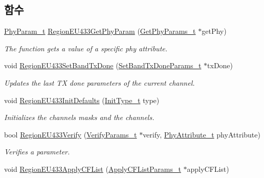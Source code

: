 \subsection*{함수}
\begin{DoxyCompactItemize}
\item 
\mbox{\hyperlink{group___r_e_g_i_o_n_gaed159b26e5c4677236b6e8677019db30}{Phy\+Param\+\_\+t}} \mbox{\hyperlink{group___r_e_g_i_o_n_e_u433_ga407d34fe6c7dea18b07732d03b62894b}{Region\+E\+U433\+Get\+Phy\+Param}} (\mbox{\hyperlink{group___r_e_g_i_o_n_gab471483fff904f4f89bbc03f7fc380ab}{Get\+Phy\+Params\+\_\+t}} $\ast$get\+Phy)
\begin{DoxyCompactList}\small\item\em The function gets a value of a specific phy attribute. \end{DoxyCompactList}\item 
void \mbox{\hyperlink{group___r_e_g_i_o_n_e_u433_gae044b69c6a72fff53e322ba8ffbc9be5}{Region\+E\+U433\+Set\+Band\+Tx\+Done}} (\mbox{\hyperlink{group___r_e_g_i_o_n_gad0524aa0673c0814a71e7a4f9cade3fc}{Set\+Band\+Tx\+Done\+Params\+\_\+t}} $\ast$tx\+Done)
\begin{DoxyCompactList}\small\item\em Updates the last TX done parameters of the current channel. \end{DoxyCompactList}\item 
void \mbox{\hyperlink{group___r_e_g_i_o_n_e_u433_ga1961913d7b9857e1804f455b59428186}{Region\+E\+U433\+Init\+Defaults}} (\mbox{\hyperlink{group___r_e_g_i_o_n_gaddc73ae10673ec925724e7870363bda9}{Init\+Type\+\_\+t}} type)
\begin{DoxyCompactList}\small\item\em Initializes the channels masks and the channels. \end{DoxyCompactList}\item 
bool \mbox{\hyperlink{group___r_e_g_i_o_n_e_u433_ga6ffa44f79bf438495ab15476274e88dd}{Region\+E\+U433\+Verify}} (\mbox{\hyperlink{group___r_e_g_i_o_n_ga966d97bc2f25df1c09e92e60ef652276}{Verify\+Params\+\_\+t}} $\ast$verify, \mbox{\hyperlink{group___r_e_g_i_o_n_ga9445b07fdf77581ecfaf389970e635f8}{Phy\+Attribute\+\_\+t}} phy\+Attribute)
\begin{DoxyCompactList}\small\item\em Verifies a parameter. \end{DoxyCompactList}\item 
void \mbox{\hyperlink{group___r_e_g_i_o_n_e_u433_gacf5995b949053267e507f4e2063fc7bf}{Region\+E\+U433\+Apply\+C\+F\+List}} (\mbox{\hyperlink{group___r_e_g_i_o_n_ga71588e9ad07e34b78fa91d51881fd3c6}{Apply\+C\+F\+List\+Params\+\_\+t}} $\ast$apply\+C\+F\+List)

\end{DoxyCompactItemize}
